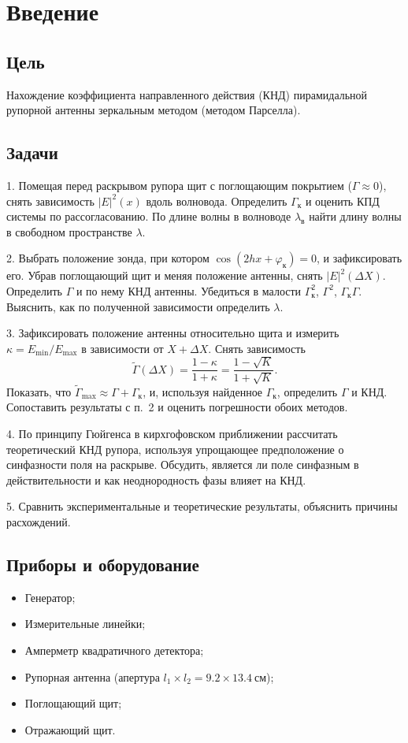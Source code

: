 \section{Введение}
\subsection*{Цель} 

Нахождение коэффициента направленного действия (КНД) пирамидальной рупорной антенны зеркальным методом (методом Парселла).

\subsection*{Задачи} 

1. Помещая перед раскрывом рупора щит с поглощающим покрытием ($\Gamma \approx 0$), снять зависимость $|E|^2(x)$ вдоль волновода. Определить $\Gamma_{\text{к}}$ и оценить КПД системы по рассогласованию. По длине волны в волноводе $\lambda_{\text{в}}$ найти длину волны в свободном пространстве $\lambda$.

2. Выбрать положение зонда, при котором $\cos(2hx + \varphi_{\text{к}}) = 0$, и зафиксировать его. Убрав поглощающий щит и меняя положение антенны, снять $|E|^2(\Delta X)$. Определить $\Gamma$ и по нему КНД антенны. Убедиться в малости $\Gamma_{\text{к}}^2$, $\Gamma^2$, $\Gamma_{\text{к}}\Gamma$. Выяснить, как по полученной зависимости определить $\lambda$.

3. Зафиксировать положение антенны относительно щита и измерить $\kappa = E_{\min}/E_{\max}$ в зависимости от $X + \Delta X$. Снять зависимость
\[
\tilde{\Gamma}(\Delta X) = \frac{1 - \kappa}{1 + \kappa} = \frac{1 - \sqrt{K}}{1 + \sqrt{K}}.
\]
Показать, что $\tilde{\Gamma}_{\max} \approx \Gamma + \Gamma_{\text{к}}$, и, используя найденное $\Gamma_{\text{к}}$, определить $\Gamma$ и КНД. Сопоставить результаты с п.~2 и оценить погрешности обоих методов.

4. По принципу Гюйгенса в кирхгофовском приближении рассчитать теоретический КНД рупора, используя упрощающее предположение о синфазности поля на раскрыве. Обсудить, является ли поле синфазным в действительности и как неоднородность фазы влияет на КНД.

5. Сравнить экспериментальные и теоретические результаты, объяснить причины расхождений.

\subsection*{Приборы и оборудование} 
\begin{itemize}
	\item Генератор;
	\item Измерительные линейки;
	\item Амперметр квадратичного детектора;
	\item Рупорная антенна (апертура $l_1 \times l_2 = 9.2 \times 13.4~\text{см}$);
	\item Поглощающий щит;
	\item Отражающий щит.
\end{itemize}